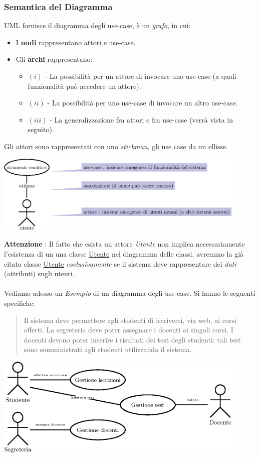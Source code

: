 \documentclass[12pt, letterpaper]{article}
\newcommand{\acc}{\\\hphantom{}\\}
\begin{document}
\subsubsection{Semantica del Diagramma}
UML fornisce il diagramma degli use-case, è un \textit{grafo}, in cui:\begin{itemize}
    \item I \textbf{nodi} rappresentano attori e use-case. 
    \item Gli \textbf{archi} rappresentano:\begin{itemize}
        \item $(i)$ - La possibilità per un attore di invocare uno use-case (a quali funzionalità può accedere un attore).
        \item $(ii)$ - La possibilità per uno use-case di invocare un altro use-case.
        \item $(iii)$ - La generalizzazione fra attori e fra use-case (verrà vista in seguito).
    \end{itemize}
\end{itemize}
Gli attori sono rappresentati con uno \textit{stickman}, gli use case da un ellisse.\begin{center}
    \includegraphics[width=0.9\textwidth ]{images/use-case.eps}
\end{center}
\textbf{Attenzione} : Il fatto che esista un attore \textit{Utente} non implica necessariamente l'esistenza di un 
una classe \underline{Utente} nel diagramma delle classi, avremmo la già citata classe \underline{Utente} 
\textit{esclusivamente} se  il sistema deve rappresentare dei \textit{dati} (attributi) sugli utenti.\acc 
Vediamo adesso un \textit{Esempio} di un diagramma degli use-case. Si hanno le seguenti specifiche: \begin{quote}
Il sistema deve permettere agli studenti di iscriversi, via web, ai corsi offerti. La segreteria deve poter
assegnare i docenti ai singoli corsi. I docenti devono poter inserire i risultati dei test degli studenti: tali
test sono somministrati agli studenti utilizzando il sistema.\end{quote}\begin{center}
    \includegraphics[width=0.9\textwidth ]{images/esempioUse-case.eps}
\end{center}
\end{document}
